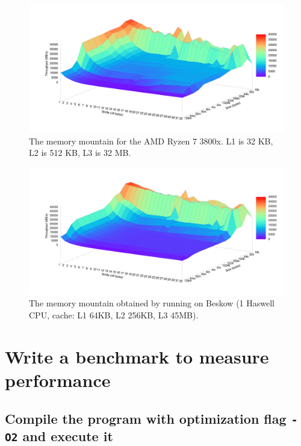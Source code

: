 \documentclass[a4paper]{article}
\begin{document}
\begin{figure}[ht!]
    \centering
    \includegraphics[scale=0.06]{memory_mountain.png}
    \captionsetup{width=.9\linewidth}
    \caption{The memory mountain for the AMD Ryzen 7 3800x. L1 is 32 KB, L2 is 512 KB, L3 is 32 MB.}
    \label{mountain}
\end{figure}

\begin{figure}[ht!]
    \centering
    \includegraphics[scale=0.06]{memory_mountain_beskow.png}
    \captionsetup{width=.9\linewidth}
    \caption{The memory mountain obtained by running on Beskow (1 Haswell CPU, cache: L1 64KB, L2 256KB, L3 45MB).}
    \label{mountain_beskow}
\end{figure}


\section{Write a benchmark to measure performance}

\subsection{Compile the program with optimization flag \texttt{-O2} and execute it}
\end{document}
